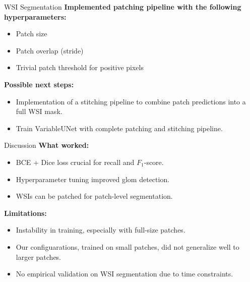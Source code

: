 \documentclass{beamer}
\begin{document}
\begin{frame}{WSI Segmentation}
    \textbf{Implemented patching pipeline with the following hyperparameters:}
    \begin{itemize}
        \item Patch size
        \item Patch overlap (stride)
        \item Trivial patch threshold for positive pixels
    \end{itemize}

    \vspace{0.5cm}

    \textbf{Possible next steps:}
    \begin{itemize}
        \item Implementation of a stitching pipeline to combine patch predictions into a full WSI mask.
        \item Train VariableUNet with complete patching and stitching pipeline.
    \end{itemize}
\end{frame}

\begin{frame}{Discussion}
    \textbf{What worked:}
    \begin{itemize}
        \item BCE + Dice loss crucial for recall and $F_1$-score.
        \item Hyperparameter tuning improved glom detection.
        \item WSIs can be patched for patch-level segmentation.
    \end{itemize}

    \vspace{0.5cm}

    \textbf{Limitations:}
    \begin{itemize}
        \item Instability in training, especially with full-size patches.
        \item Our configuarations, trained on small patches, did not generalize well to larger patches.
        \item No empirical validation on WSI segmentation due to time constraints.
    \end{itemize}
\end{frame}
\end{document}
